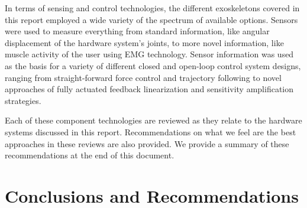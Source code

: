 \documentclass[letterpaper,12pt,fullpage]{article}
\begin{document}
In terms of sensing and control technologies, the different exoskeletons covered in this report employed a wide variety of the spectrum of available options.  Sensors were used to measure everything from standard information, like angular displacement of the hardware system's joints, to more novel information, like muscle activity of the user using EMG technology.  Sensor information was used as the basis for a variety of different closed and open-loop control system designs, ranging from straight-forward force control and trajectory following to novel approaches of fully actuated feedback linearization and sensitivity amplification strategies.  

Each of these component technologies are reviewed as they relate to the hardware systems discussed in this report.  Recommendations on what we feel are the best approaches in these reviews are also provided.  We provide a summary of these recommendations at the end of this document.

%



















\section{Conclusions and Recommendations}
\label{survey:recommend}
\end{document}
